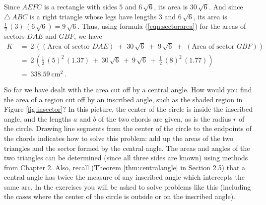 \begin{exmp}
Since $AEFC$ is a rectangle with sides $5$ and $6\,\sqrt{6}$, its area is $30\,\sqrt{6}$. And since
$\triangle\,ABC$ is a right triangle whose legs have lengths $3$ and $6\,\sqrt{6}$, its area is
$\frac{1}{2}\,(3)\,(6\,\sqrt{6}) = 9\,\sqrt{6}$. Thus, using formula (\ref{eqn:sectorarea}) for the
areas of sectors $DAE$ and $GBF$, we have
\begin{align*}
 K ~&=~ 2\,\left( (\text{Area of sector $DAE$}) \;+\; 30\,\sqrt{6} \;+\; 9\,\sqrt{6} \;+\;
  (\text{Area of sector $GBF$}) \right)\\
 &=~ 2\,\left( \tfrac{1}{2}\,(5)^2 \,(1.37) ~+~ 30\,\sqrt{6} ~+~ 9\,\sqrt{6} ~+~
  \tfrac{1}{2}\,(8)^2 \,(1.77) \right)\\
 &=~ \boxed{338.59~\text{cm}^2}~.
\end{align*}
\end{exmp}
\divider
\newpage
\piccaption[]{\label{fig:insector}}
So far we have dealt with the area cut off by a central angle. How would you find the area of a
region cut off by an inscribed angle, such as the shaded region in Figure \ref{fig:insector}? In
this picture, the center of the circle is inside the inscribed angle, and the lengths $a$ and $b$
of the two
chords are given, as is the radius $r$ of the circle. Drawing line segments from the center of the
circle to the endpoints of the chords indicates how to solve this problem: add up the areas of the
two triangles and the sector formed by the central angle. The areas and angles of the two triangles
can be determined (since all three sides are known) using methods from Chapter 2. Also, recall
(Theorem \ref{thm:centralangle} in Section 2.5) that a central angle has twice the measure of any
inscribed angle which intercepts the same arc. In the exercises you will be asked to solve problems
like this (including the cases where the center of the circle is outside or on the inscribed angle).

